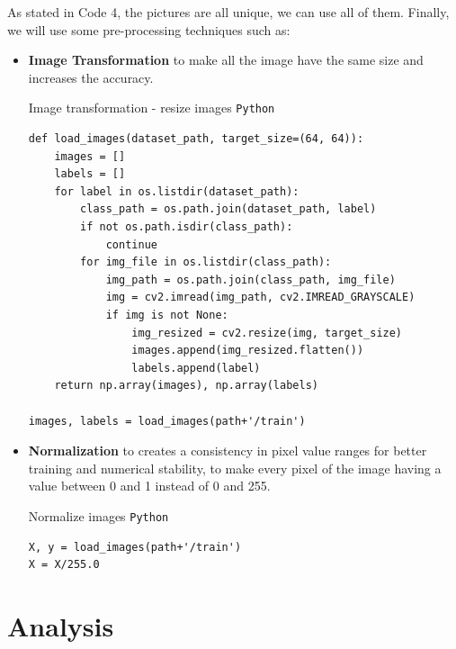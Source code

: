 \documentclass{modeleRapport}
\begin{document}
As stated in Code 4, the pictures are all unique, we can use all of them.
\newpage
Finally, we will use some pre-processing techniques such as:\\
\begin{itemize}

\item \textbf{Image Transformation} to make all the image have the same size and increases the accuracy.\\

\begin{codebox}{Image transformation - resize images \texttt{Python}}
\begin{lstlisting}
def load_images(dataset_path, target_size=(64, 64)):
    images = []
    labels = []
    for label in os.listdir(dataset_path):
        class_path = os.path.join(dataset_path, label)
        if not os.path.isdir(class_path):
            continue
        for img_file in os.listdir(class_path):
            img_path = os.path.join(class_path, img_file)
            img = cv2.imread(img_path, cv2.IMREAD_GRAYSCALE) 
            if img is not None:
                img_resized = cv2.resize(img, target_size) 
                images.append(img_resized.flatten())
                labels.append(label)
    return np.array(images), np.array(labels)

images, labels = load_images(path+'/train')
\end{lstlisting}
\end{codebox}

\bigskip

\item \textbf{Normalization} to creates a consistency in pixel value ranges for better training and numerical stability, to make every pixel of the image having a value between 0 and 1 instead of 0 and 255.\\

\begin{codebox}{Normalize images \texttt{Python}}
\begin{lstlisting}
X, y = load_images(path+'/train')
X = X/255.0
\end{lstlisting}
\end{codebox}

\end{itemize}

\newpage

\section{Analysis}
\end{document}
